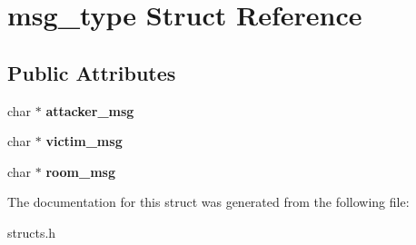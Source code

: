 \hypertarget{structmsg__type}{}\section{msg\+\_\+type Struct Reference}
\label{structmsg__type}
\subsection*{Public Attributes}
\begin{DoxyCompactItemize}
\item 
\mbox{\label{structmsg__type_ae3e0e3f99fc89b890a07fbbe55faca50}} 
char $\ast$ {\bfseries attacker\+\_\+msg}
\item 
\mbox{\label{structmsg__type_ae9a7bafabfd4e3db88146aa2c6113f1e}} 
char $\ast$ {\bfseries victim\+\_\+msg}
\item 
\mbox{\label{structmsg__type_a766cdea233f2b1d252ca40bd2a459c7a}} 
char $\ast$ {\bfseries room\+\_\+msg}
\end{DoxyCompactItemize}


The documentation for this struct was generated from the following file\+:\begin{DoxyCompactItemize}
\item 
structs.\+h\end{DoxyCompactItemize}
